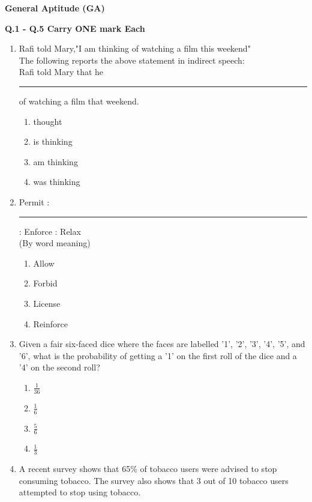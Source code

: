 \documentclass[journal,13pt,onecolumn]{exam}
\theoremstyle{remark}
\begin{document}
\textbf{General Aptitude (GA)}

\vspace{1em}

\textbf{Q.1 - Q.5 Carry ONE mark Each}\

\begin{enumerate}[label=Q.\arabic*]

\item Rafi told Mary,"I am thinking of watching a film this weekend"\\
The following reports the above statement in indirect speech:\\
Rafi told Mary that he \rule{2cm}{0.15mm} of watching a film that weekend.

\begin{enumerate}[label=(\Alph*)]
    \item thought
    \item is thinking
    \item am thinking
    \item was thinking
\end{enumerate}

\item Permit : \rule{1.5cm}{0.15mm} : Enforce : Relax \\
(By word meaning)

\begin{enumerate}[label=(\Alph*)]
    \item Allow
    \item Forbid
    \item License
    \item Reinforce
\end{enumerate}

\item Given a fair six-faced dice where the faces are labelled '1', '2', '3', '4', '5', and '6', what is the probability of getting a '1' on the first roll of the dice and a '4' on the second roll?

\begin{enumerate}[label=(\Alph*)]
    \item $\frac{1}{36}$
    \item $\frac{1}{6}$
    \item $\frac{5}{6}$
    \item $\frac{1}{3}$
\end{enumerate}
\newpage
\item A recent survey shows that 65\% of tobacco users were advised to stop consuming tobacco. The survey also shows that 3 out of 10 tobacco users attempted to stop using tobacco.


\end{enumerate}
\end{document}

